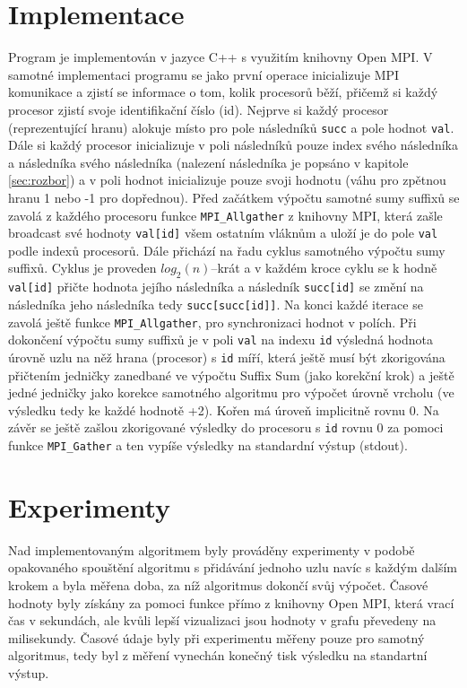 \documentclass[12pt, a4paper]{article}
\begin{document}
\section{Implementace}
Program je implementován v jazyce C++ s využitím knihovny Open MPI. V samotné implementaci programu se jako první operace inicializuje MPI komunikace a zjistí se informace o tom, kolik procesorů běží, přičemž si každý procesor zjistí svoje identifikační číslo (id). Nejprve si každý procesor (reprezentující hranu) alokuje místo pro pole následníků \texttt{succ} a pole hodnot \texttt{val}. Dále si každý procesor inicializuje v poli následníků pouze index svého následníka a následníka svého následníka (nalezení následníka je popsáno v kapitole\,\ref{sec:rozbor}) a v poli hodnot inicializuje pouze svoji hodnotu (váhu pro zpětnou hranu 1 nebo -1 pro dopřednou). Před začátkem výpočtu samotné sumy suffixů se zavolá z každého procesoru funkce \texttt{MPI\_Allgather} z knihovny MPI, která zašle broadcast své hodnoty \texttt{val[id]} všem ostatním vláknům a uloží je do pole \texttt{val} podle indexů procesorů. Dále přichází na řadu cyklus samotného výpočtu sumy suffixů. Cyklus je proveden $log_{2}(n)$--krát a v každém kroce cyklu se k hodně \texttt{val[id]} přičte hodnota jejího následníka a následník \texttt{succ[id]} se změní na následníka jeho následníka tedy \texttt{succ[succ[id]]}. Na konci každé iterace se zavolá ještě funkce \texttt{MPI\_Allgather}, pro synchronizaci hodnot v polích. Při dokončení výpočtu sumy suffixů je v poli \texttt{val} na indexu \texttt{id} výsledná hodnota úrovně uzlu na něž hrana (procesor) s \texttt{id} míří, která ještě musí být zkorigována přičtením jedničky zanedbané ve výpočtu Suffix Sum (jako korekční krok) a ještě jedné jedničky jako korekce samotného algoritmu pro výpočet úrovně vrcholu (ve výsledku tedy ke každé hodnotě +2). Kořen má úroveň implicitně rovnu 0. Na závěr se ještě zašlou zkorigované výsledky do procesoru s \texttt{id} rovnu 0 za pomoci funkce \texttt{MPI\_Gather} a ten vypíše výsledky na standardní výstup (stdout).


\section{Experimenty}
Nad implementovaným algoritmem byly prováděny experimenty v podobě opakovaného spouštění algoritmu s přidávání jednoho uzlu navíc s každým dalším krokem a byla měřena doba, za níž algoritmus dokončí svůj výpočet. Časové hodnoty byly získány za pomoci funkce přímo z knihovny Open MPI, která vrací čas v sekundách, ale kvůli lepší vizualizaci jsou hodnoty v grafu převedeny na milisekundy. Časové údaje byly při experimentu měřeny pouze pro samotný algoritmus, tedy byl z měření vynechán konečný tisk výsledku na standartní výstup.
\end{document}
